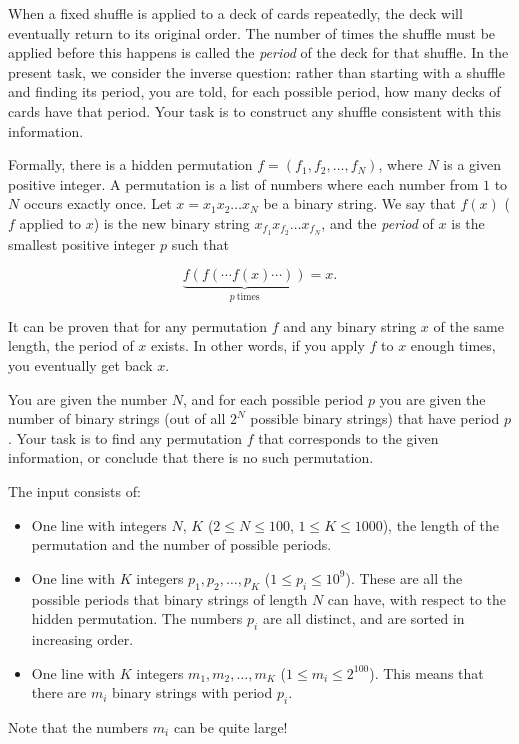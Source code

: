 
When a fixed shuffle is applied to a deck of cards repeatedly, the deck will eventually return to its original order. 
The number of times the shuffle must be applied before this happens is called the \textit{period} of the deck for that shuffle.
In the present task, we consider the inverse question: rather than starting with a shuffle and finding its period, 
you are told, for each possible period, how many decks of cards have that period. Your task is to construct any 
shuffle consistent with this information.

Formally, there is a hidden permutation $f = (f_1, f_2, \dots, f_N)$, where $N$ is a given positive integer. A permutation is a list of numbers where
each number from $1$ to $N$ occurs exactly once. Let $x = x_1x_2 \dots x_N$ be a binary string. We say that $f(x)$ ($f$ applied to $x$) is the new
binary string $x_{f_1}x_{f_2} \dots x_{f_N}$, and the \textit{period} of $x$ is the smallest positive integer $p$ such that 

$$\underbrace{f(f(\cdots f(x)\cdots))}_{p\ \text{times}} =  x.$$

It can be proven that for any permutation $f$ and any binary string $x$ of the same length, the period of $x$ exists. In other words, 
if you apply $f$ to $x$ enough times, you eventually get back $x$.

You are given the number $N$, and for each possible period $p$ you are given the number of binary strings 
 (out of all $2^N$ possible binary strings) that have period $p$. Your task is to find any permutation $f$ that corresponds to the given information, 
 or conclude that there is no such permutation.

\begin{Input}
    The input consists of:
    \begin{itemize}
      \item One line with integers $N$, $K$ ($2 \leq N \leq 100$, $1 \leq K \leq 1000$), the length of the permutation and the number of possible periods.

      \item One line with $K$ integers $p_1, p_2, \dots, p_K$ ($1 \leq p_i \leq 10^9$). These are all the possible periods that binary strings of 
      length $N$ can have, with respect to the hidden permutation. The numbers $p_i$ are all distinct, and are sorted in increasing order.

      \item One line with $K$ integers $m_1, m_2, \dots, m_K$ ($1 \leq m_i \leq 2^{100}$). This means 
      that there are $m_i$ binary strings with period $p_i$.

    \end{itemize}
    
    Note that the numbers $m_i$ can be quite large!

\end{Input}

